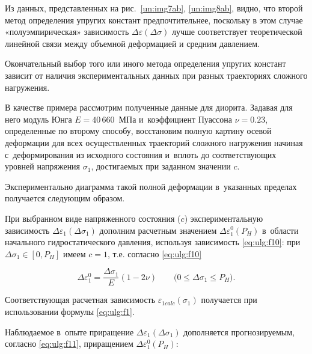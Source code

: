 Из данных, представленных на рис.~\ref{un:img7ab}, \ref{un:img8ab}, видно, что второй метод определения упругих констант предпочтительнее, поскольку в этом случае «полуэмпирическая» зависимость $\Delta\varepsilon(\Delta\sigma)$ лучше соответствует теоретической линейной связи между объемной деформацией и средним давлением. 

Окончательный выбор того или иного метода определения упругих констант зависит от наличия экспериментальных данных при разных траекториях сложного нагружения. 





\smallskip




В качестве примера рассмотрим полученные данные для диорита. Задавая для него модуль Юнга $E=40\,660$~МПа и~коэффициент Пуассона $\nu=0.23$, определенные по второму способу, восстановим полную картину осевой деформации для всех осуществленных траекторий сложного нагружения начиная с~деформирования из исходного состояния и~вплоть до соответствующих уровней напряжения $\sigma_1$, достигаемых при заданном значении $c$. 

Экспериментально диаграмма такой полной деформации в~указанных пределах получается следующим образом.  

При выбранном виде напряженного состояния ($c$)  экспериментальную зависимость  $\Delta\varepsilon_1 (\Delta\sigma_1 )$  дополним расчетным значением $\Delta\varepsilon^0_1(P_H )$ в~области начального гидростатического давления, используя зависимость \eqref{eq:ulg:f10}: при $\Delta\sigma_1\in [0,P_H ]$ имеем $c=1$, т.е. согласно \eqref{eq:ulg:f10}

\begin{equation} 

\label{eq:ulg:f11} 

\Delta\varepsilon^0_1=\frac{\Delta\sigma_1}{E}(1-2\nu)  \qquad  \big(0\le\Delta\sigma_1\le P_H\big). 

\end{equation} 



Соответствующая расчетная зависимость $\varepsilon_{1calc} (\sigma_1 )$  получается при использовании формулы \eqref{eq:ulg:f1}. 

Наблюдаемое в~опыте приращение $\Delta\varepsilon_1 (\Delta\sigma_1 )$ дополняется прогнозируемым, согласно \eqref{eq:ulg:f11}, приращением  $\Delta\varepsilon^0_1 (P_H )$: 

